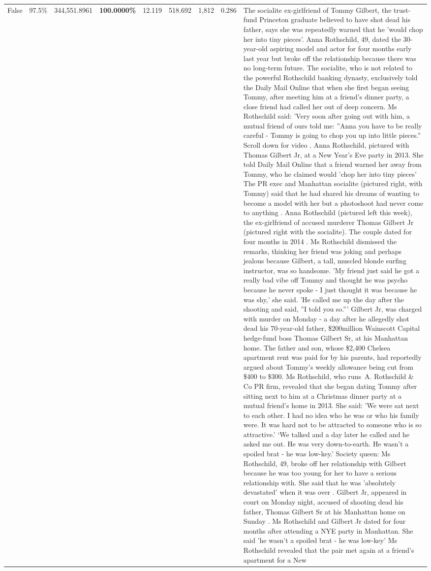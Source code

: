 \begin{table}[H]
\begin{tabular}{lllrlllll}
False & 97.5\% & 344,551.8961 & \bfseries \color{red} 100.0000\% & 12.119 & 518.692 & 1,812 & 0.286 & The socialite ex-girlfriend of Tommy Gilbert, the trust-fund Princeton graduate believed to have shot dead his father, says she was repeatedly warned that he 'would chop her into tiny pieces'. Anna Rothschild, 49, dated the 30-year-old aspiring model and actor for four months early last year but broke off the relationship because there was no long-term future. The socialite, who is not related to the powerful Rothschild banking dynasty, exclusively told the Daily Mail Online that when she first began seeing Tommy, after meeting him at a friend's dinner party, a close friend had called her out of deep concern. Ms Rothschild said: 'Very soon after going out with him, a mutual friend of ours told me: ''Anna you have to be really careful - Tommy is going to chop you up into little pieces.'' Scroll down for video . Anna Rothschild, pictured with Thomas Gilbert Jr, at a New Year's Eve party in 2013. She told Daily Mail Online that a friend warned her away from Tommy, who he claimed would 'chop her into tiny pieces' The PR exec and Manhattan socialite (pictured right, with Tommy) said that he had shared his dreams of wanting to become a model with her but a photoshoot had never come to anything . Anna Rothschild (pictured left this week), the ex-girlfriend of accused murderer Thomas Gilbert Jr (pictured right with the socialite). The couple dated for four months in 2014 . Ms Rothschild dismissed the remarks, thinking her friend was joking and perhaps jealous because Gilbert, a tall, muscled blonde surfing instructor, was so handsome. 'My friend just said he got a really bad vibe off Tommy and thought he was psycho because he never spoke - I just thought it was because he was shy,' she said. 'He called me up the day after the shooting and said, ''I told you so.''' Gilbert Jr, was charged with murder on Monday - a day after he allegedly shot dead his 70-year-old father, \$200million Wainscott Capital hedge-fund boss Thomas Gilbert Sr, at his Manhattan home. The father and son, whose \$2,400 Chelsea apartment rent was paid for by his parents, had reportedly argued about Tommy's weekly allowance being cut from \$400 to \$300. Ms Rothschild, who runs A. Rothschild \& Co PR firm, revealed that she began dating Tommy after sitting next to him at a Christmas dinner party at a mutual friend's home in 2013. She said: 'We were sat next to each other. I had no idea who he was or who his family were. It was hard not to be attracted to someone who is so attractive.' ‘We talked and a day later he called and he asked me out. He was very down-to-earth. He wasn’t a spoiled brat - he was low-key.’ Society queen: Ms Rothschild, 49, broke off her relationship with Gilbert because he was too young for her to have a serious relationship with. She said that he was 'absolutely devastated' when it was over . Gilbert Jr, appeared in court on Monday night, accused of shooting dead his father, Thomas Gilbert Sr at his Manhattan home on Sunday . Ms Rothschild and Gilbert Jr dated for four months after attending a NYE party in Manhattan. She said 'he wasn't a spoiled brat - he was low-key' Ms Rothschild revealed that the pair met again at a friend’s apartment for a New 
\end{tabular}
\end{table}
